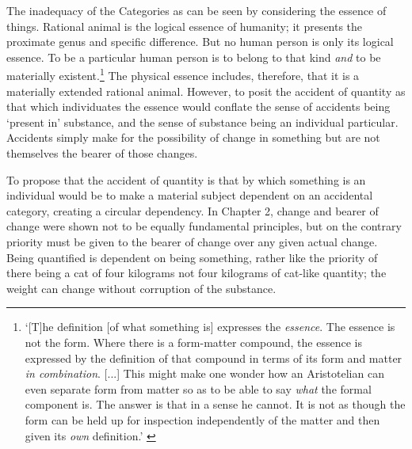 The inadequacy of the Categories as can be seen by considering the essence of things. Rational animal is the logical essence of humanity; it presents the proximate genus and specific difference.
But no human person is only its logical essence.
To be a particular human person is to belong to that kind \emph{and} to be materially existent.\footnote{`[T]he definition [of what something is] expresses the \emph{essence}. The essence is not the form. Where there is a form-matter compound, the essence is expressed by the definition of that compound in terms of its form and matter \emph{in combination}. [...] This might make one wonder how an Aristotelian can even separate form from matter so as to be able to say \emph{what} the formal component is. The answer is that in a sense he cannot. It is not as though the form can be held up for inspection independently of the matter and then given its \emph{own} definition.' \parencite[][167--68]{Oderberg2014-ODEIFS}} The physical essence includes, therefore, that it is a materially extended rational animal. However, to posit the accident of quantity as that which individuates the essence would conflate the sense of accidents being `present in' substance, and the sense of substance being an individual particular. Accidents simply make for the possibility of change in something but are not themselves the bearer of those changes.

To propose that the accident of quantity is that by which something is an individual would be to make a material subject dependent on an accidental category, creating a circular dependency. In Chapter 2, change and bearer of change were shown not to be equally fundamental principles, but on the contrary priority must be given to the bearer of change over any given actual change. Being quantified is dependent on being something, rather like the priority of there being a cat of four kilograms not four kilograms of cat-like quantity; the weight can change without corruption of the substance.

